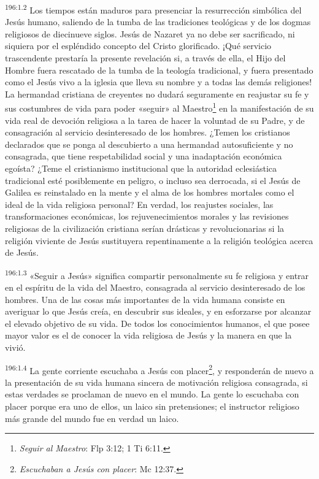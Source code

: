 \par
\textsuperscript{196:1.2} Los tiempos están maduros para presenciar la resurrección simbólica del Jesús humano, saliendo de la tumba de las tradiciones teológicas y de los dogmas religiosos de diecinueve siglos. Jesús de Nazaret ya no debe ser sacrificado, ni siquiera por el espléndido concepto del Cristo glorificado. ¡Qué servicio trascendente prestaría la presente revelación si, a través de ella, el Hijo del Hombre fuera rescatado de la tumba de la teología tradicional, y fuera presentado como el Jesús vivo a la iglesia que lleva su nombre y a todas las demás religiones! La hermandad cristiana de creyentes no dudará seguramente en reajustar su fe y sus costumbres de vida para poder «seguir» al Maestro\footnote{\textit{Seguir al Maestro}: Flp 3:12; 1 Ti 6:11.} en la manifestación de su vida real de devoción religiosa a la tarea de hacer la voluntad de su Padre, y de consagración al servicio desinteresado de los hombres. ¿Temen los cristianos declarados que se ponga al descubierto a una hermandad autosuficiente y no consagrada, que tiene respetabilidad social y una inadaptación económica egoísta? ¿Teme el cristianismo institucional que la autoridad eclesiástica tradicional esté posiblemente en peligro, o incluso sea derrocada, si el Jesús de Galilea es reinstalado en la mente y el alma de los hombres mortales como el ideal de la vida religiosa personal? En verdad, los reajustes sociales, las transformaciones económicas, los rejuvenecimientos morales y las revisiones religiosas de la civilización cristiana serían drásticas y revolucionarias si la religión viviente de Jesús sustituyera repentinamente a la religión teológica acerca de Jesús.

\par
\textsuperscript{196:1.3} «Seguir a Jesús» significa compartir personalmente su fe religiosa y entrar en el espíritu de la vida del Maestro, consagrada al servicio desinteresado de los hombres. Una de las cosas más importantes de la vida humana consiste en averiguar lo que Jesús creía, en descubrir sus ideales, y en esforzarse por alcanzar el elevado objetivo de su vida. De todos los conocimientos humanos, el que posee mayor valor es el de conocer la vida religiosa de Jesús y la manera en que la vivió.

\par
\textsuperscript{196:1.4} La gente corriente escuchaba a Jesús con placer\footnote{\textit{Escuchaban a Jesús con placer}: Mc 12:37.}, y responderán de nuevo a la presentación de su vida humana sincera de motivación religiosa consagrada, si estas verdades se proclaman de nuevo en el mundo. La gente lo escuchaba con placer porque era uno de ellos, un laico sin pretensiones; el instructor religioso más grande del mundo fue en verdad un laico.

